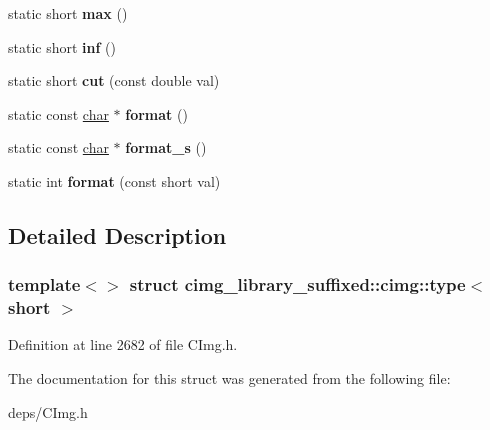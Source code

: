 \begin{DoxyCompactItemize}
static short {\bfseries max} ()
\item 
\mbox{\label{structcimg__library__suffixed_1_1cimg_1_1type_3_01short_01_4_a49d9723abe2149d1573489594dbb3e40}} 
static short {\bfseries inf} ()
\item 
\mbox{\label{structcimg__library__suffixed_1_1cimg_1_1type_3_01short_01_4_a9bc37d2ac7c6fe2063ec0b1596592900}} 
static short {\bfseries cut} (const double val)
\item 
\mbox{\label{structcimg__library__suffixed_1_1cimg_1_1type_3_01short_01_4_a32f65164552e62c36630d4a8b8a36e54}} 
static const \hyperlink{classchar}{char} $\ast$ {\bfseries format} ()
\item 
\mbox{\label{structcimg__library__suffixed_1_1cimg_1_1type_3_01short_01_4_af7990b5a7171dbfb41fd8931a0bf3186}} 
static const \hyperlink{classchar}{char} $\ast$ {\bfseries format\+\_\+s} ()
\item 
\mbox{\label{structcimg__library__suffixed_1_1cimg_1_1type_3_01short_01_4_af64eabd45d19d06705f64d10148f9353}} 
static int {\bfseries format} (const short val)
\end{DoxyCompactItemize}


\subsection{Detailed Description}
\subsubsection*{template$<$$>$\newline
struct cimg\+\_\+library\+\_\+suffixed\+::cimg\+::type$<$ short $>$}



Definition at line 2682 of file C\+Img.\+h.



The documentation for this struct was generated from the following file\+:\begin{DoxyCompactItemize}
\item 
deps/C\+Img.\+h\end{DoxyCompactItemize}
